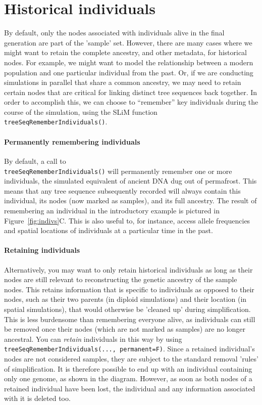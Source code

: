 \documentclass[12pt]{article}
\begin{document}
\section*{Historical individuals}
By default, only the nodes associated with individuals alive in the final generation are part of the 'sample' set.
However, there are many cases where we might want to retain the complete ancestry, and other metadata, for
historical nodes. For example, we might want to model the relationship between a modern population and
one particular individual from the past. Or, if we are conducting simulations in parallel that share 
a common ancestry, we may need to retain certain nodes that are critical for linking distinct
tree sequences back together.
In order to accomplish this, we can choose to ``remember'' key individuals during the course of the simulation,
using the SLiM function \verb|treeSeqRememberIndividuals()|.

\paragraph{Permanently remembering individuals}
By default, a call to \\ 
\verb|treeSeqRememberIndividuals()| will permanently remember one or more individuals,
the simulated equivalent of ancient DNA dug out of permafrost.
This means that any tree sequence subsequently recorded will always contain this individual,
its nodes (now marked as samples), and its full ancestry.
The result of remembering an individual in the introductory example is pictured
in Figure~\ref{fig:indivs}C.
This is also useful to, for instance, access allele frequencies and spatial locations of individuals
at a particular time in the past.

\paragraph{Retaining individuals}
Alternatively, you may want to only retain historical individuals as long as their nodes are still
relevant to reconstructing the genetic ancestry of the sample nodes.
This retains information that is specific to individuals as opposed to their nodes,
such as their two parents (in diploid simulations) and their location (in spatial simulations), that would otherwise be 'cleaned up' during simplification.
This is less burdensome than remembering everyone alive, as individuals can still be removed once their
nodes (which are not marked as samples) are no longer ancestral.
You can \emph{retain} individuals in this way by using
\verb|treeSeqRememberIndividuals(..., permanent=F)|.
Since a retained individual’s nodes are not considered samples,
they are subject to the standard removal 'rules' of simplification.
It is therefore possible to end up with an individual containing only one genome, as shown in the diagram.
However, as soon as both nodes of a retained individual have been lost,
the individual and any information associated with it is deleted too.
\end{document}
